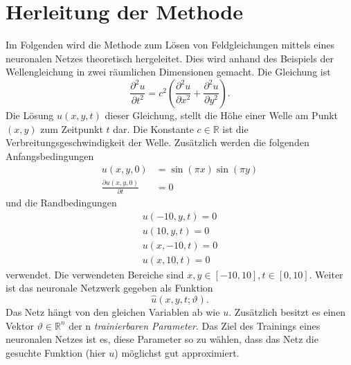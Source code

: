 %
%
%
%

\section{Herleitung der Methode\label{neuronal:section:herleitung}}

Im Folgenden wird die Methode zum Lösen von Feldgleichungen mittels eines neuronalen Netzes theoretisch hergeleitet.
Dies wird anhand des Beispiels der Wellengleichung in zwei räumlichen Dimensionen gemacht.
Die Gleichung ist
\begin{equation}
    \frac{\partial^2 u}{\partial t^2} = c^2 \left( \frac{\partial^2 u}{\partial x^2} + \frac{\partial^2 u}{\partial y^2} \right).
    \label{neuronal:wellengleichung}
\end{equation}
Die Lösung \( u(x, y, t) \) dieser Gleichung, stellt die Höhe einer Welle am Punkt \( (x, y) \) zum Zeitpunkt \( t \) dar.
Die Konstante \( c \in \mathbb{R} \) ist die Verbreitungsgeschwindigkeit der Welle.
Zusätzlich werden die folgenden Anfangsbedingungen
\begin{equation}
    \begin{aligned}
        u(x, y, 0) &= \sin(\pi x) \sin(\pi y)\\
        \frac{\partial u(x, y, 0)}{\partial t} &= 0
    \end{aligned}
    \label{neuronal:initial}
\end{equation}
und die Randbedingungen
\begin{equation}
    \begin{aligned}
        u(-10, y, t) = 0\\
        u(10, y, t) = 0\\
        u(x, -10, t) = 0\\
        u(x, 10, t) = 0
    \end{aligned}
    \label{neuronal:rand}
\end{equation}
verwendet.
Die verwendeten Bereiche sind \( x, y \in [-10,10], t \in [0,10] \).
Weiter ist das neuronale Netzwerk gegeben als Funktion
\begin{equation}
    \hat{u}(x, y, t; \vartheta).
    \label{neuronal:nn}
\end{equation}
Das Netz hängt von den gleichen Variablen ab wie \( u \).
Zusätzlich besitzt es einen Vektor \( \vartheta \in \mathbb{R}^n \) der n \emph{trainierbaren Parameter}.
Das Ziel des Trainings eines neuronalen Netzes ist es, diese Parameter so zu wählen, dass das Netz die gesuchte Funktion (hier \( u \)) möglichst gut approximiert.


